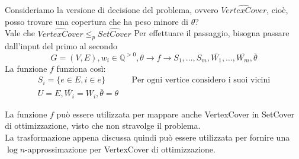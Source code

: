 Consideriamo la versione di decisione del problema, ovvero $\hat{\mathit{VertexCover}}$, cioè, 
posso trovare una copertura che ha peso minore di $\theta$?\\

Vale che $\hat{\mathit{VertexCover}} \leq_{p} \hat{\mathit{SetCover}}$
Per effettuare il passaggio, bisogna passare dall'input del primo al secondo
$$G=(V,E), w_i \in \mathbb{Q}^{>0}, \theta \longrightarrow f \longrightarrow S_1, \dots, S_m, \bar{W_1}, \dots, \bar{W_m},\bar{\theta}$$
La funzione $f$ funziona così: 
\begin{equation}
    \begin{aligned}
        S_i = \{ e \in E, i \in e \} && \text{Per ogni vertice considero i suoi vicini}\\
        U = E, \bar{W_i} = W_i, \bar{\theta} = \theta
    \end{aligned}
\end{equation}
\begin{remark}
    La funzione $f$ può essere utilizzata per mappare anche VertexCover in SetCover di ottimizzazione, 
    visto che non stravolge il problema.\\
    La trasformazione appena discussa quindi può essere utilizzata per fornire una $\log n$-approssimazione
    per VertexCover di ottimizzazione.
\end{remark}
